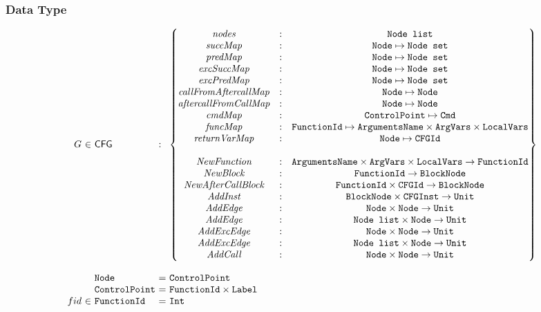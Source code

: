 \subsubsection{Data Type}
\[
\begin{array}{r@{~}l@{~}l@{}l@{~}l}
G&\in&\CFG & : &
	\begin{Bmatrix}
	\emph{nodes} &:&\Nodelist\\ 
	\emph{succMap} &:&\Node \mapsto\Nodeset\\
	\emph{predMap} &:&\Node \mapsto\Nodeset\\
	\emph{excSuccMap} &:&\Node \mapsto\Nodeset\\
	\emph{excPredMap} &:&\Node \mapsto\Nodeset\\
	\emph{callFromAftercallMap} &:&\Node \mapsto \Node\\
	\emph{aftercallFromCallMap} &:&\Node \mapsto \Node\\
	\emph{cmdMap} &:& \ControlPoint \mapsto \TT{Cmd}\\
	\emph{funcMap} &:& \FunctionId \mapsto \TT{ArgumentsName} \times \ArgVars \times \LocalVars\\
	\emph{returnVarMap} &:& \Node \mapsto \TT{CFGId} \\
	&&\\
	\emph{NewFunction} &:& \TT{ArgumentsName} \times \ArgVars \times \LocalVars \rightarrow \FunctionId\\
	\emph{NewBlock} &:& \FunctionId \rightarrow \TT{BlockNode}\\
	\emph{NewAfterCallBlock} &:& \FunctionId \times \TT{CFGId} \rightarrow \TT{BlockNode}\\
	\emph{AddInst} &:& \TT{BlockNode} \times \TT{CFGInst} \rightarrow \Unit\\
	\emph{AddEdge} &:&\Node \times\Node \rightarrow \Unit\\
	\emph{AddEdge} &:&\Nodelist \times\Node \rightarrow \Unit\\
	\emph{AddExcEdge} &:&\Node \times\Node \rightarrow \Unit\\
	\emph{AddExcEdge} &:&\Nodelist \times\Node \rightarrow \Unit\\
	\emph{AddCall} &:&\Node \times\Node \rightarrow \Unit\\
	\end{Bmatrix}\\
&&\\
&&\Node & = & \ControlPoint\\
&&\ControlPoint\ &=& \FunctionId \times \Label\\
fid&\in&\FunctionId &=& \TT{Int}\\

\end{array}\]

